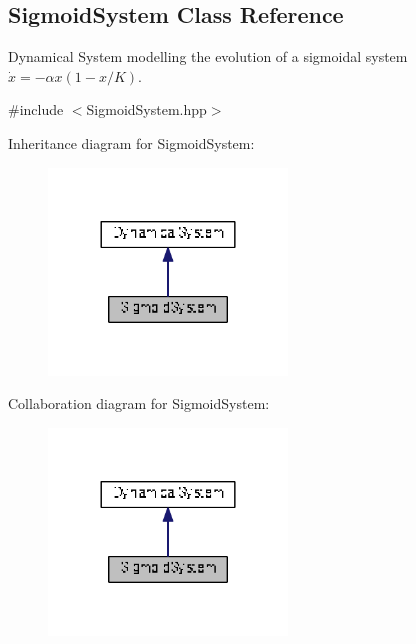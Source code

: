 \hypertarget{classDmpBbo_1_1SigmoidSystem}{\subsection{Sigmoid\+System Class Reference}
\label{classDmpBbo_1_1SigmoidSystem}
}


Dynamical System modelling the evolution of a sigmoidal system $\dot{x} = -\alpha x(1-x/K)$.  




{\ttfamily \#include $<$Sigmoid\+System.\+hpp$>$}



Inheritance diagram for Sigmoid\+System\+:
\nopagebreak
\begin{figure}[H]
\begin{center}
\leavevmode
\includegraphics[width=180pt]{classDmpBbo_1_1SigmoidSystem__inherit__graph}
\end{center}
\end{figure}


Collaboration diagram for Sigmoid\+System\+:
\nopagebreak
\begin{figure}[H]
\begin{center}
\leavevmode
\includegraphics[width=180pt]{classDmpBbo_1_1SigmoidSystem__coll__graph}
\end{center}
\end{figure}
